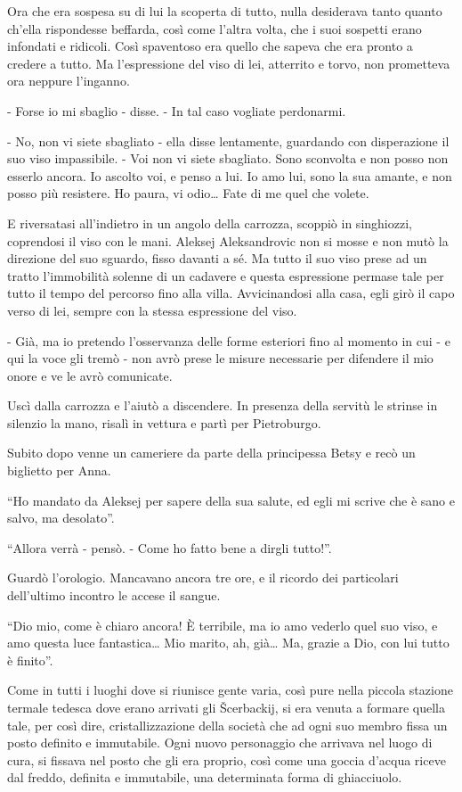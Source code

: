 Ora che era sospesa su di lui la scoperta di tutto, nulla desiderava tanto quanto ch'ella rispondesse beffarda, così come l'altra volta, che i suoi sospetti erano infondati e ridicoli. Così spaventoso era quello che sapeva che era pronto a credere a tutto. Ma l'espressione del viso di lei, atterrito e torvo, non prometteva ora neppure l'inganno. 

- Forse io mi sbaglio - disse. - In tal caso vogliate perdonarmi. 

- No, non vi siete sbagliato - ella disse lentamente, guardando con disperazione il suo viso impassibile. - Voi non vi siete sbagliato. Sono sconvolta e non posso non esserlo ancora. Io ascolto voi, e penso a lui. Io amo lui, sono la sua amante, e non posso più resistere. Ho paura, vi odio\ldots{} Fate di me quel che volete. 

E riversatasi all'indietro in un angolo della carrozza, scoppiò in singhiozzi, coprendosi il viso con le mani. Aleksej Aleksandrovic non si mosse e non mutò la direzione del suo sguardo, fisso davanti a sé. Ma tutto il suo viso prese ad un tratto l'immobilità solenne di un cadavere e questa espressione permase tale per tutto il tempo del percorso fino alla villa. Avvicinandosi alla casa, egli girò il capo verso di lei, sempre con la stessa espressione del viso. 

- Già, ma io pretendo l'osservanza delle forme esteriori fino al momento in cui - e qui la voce gli tremò - non avrò prese le misure necessarie per difendere il mio onore e ve le avrò comunicate. 

Uscì dalla carrozza e l'aiutò a discendere. In presenza della servitù le strinse in silenzio la mano, risalì in vettura e partì per Pietroburgo. 

Subito dopo venne un cameriere da parte della principessa Betsy e recò un biglietto per Anna. 

``Ho mandato da Aleksej per sapere della sua salute, ed egli mi scrive che è sano e salvo, ma desolato''. 

``Allora verrà - pensò. - Come ho fatto bene a dirgli tutto!''. 

Guardò l'orologio. Mancavano ancora tre ore, e il ricordo dei particolari dell'ultimo incontro le accese il sangue. 

``Dio mio, come è chiaro ancora! È terribile, ma io amo vederlo quel suo viso, e amo questa luce fantastica\ldots{} Mio marito, ah, già\ldots{} Ma, grazie a Dio, con lui tutto è finito''. 

Come in tutti i luoghi dove si riunisce gente varia, così pure nella piccola stazione termale tedesca dove erano arrivati gli Šcerbackij, si era venuta a formare quella tale, per così dire, cristallizzazione della società che ad ogni suo membro fissa un posto definito e immutabile. Ogni nuovo personaggio che arrivava nel luogo di cura, si fissava nel posto che gli era proprio, così come una goccia d'acqua riceve dal freddo, definita e immutabile, una determinata forma di ghiacciuolo. 

